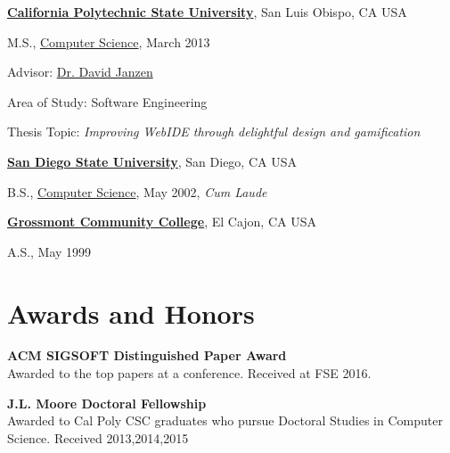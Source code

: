 \documentclass[10pt]{article}
\begin{document}
        
\href{http://www.calpoly.edu/}{\textbf{California Polytechnic State University}},
San Luis Obispo, CA USA
\begin{outerlist}
\item[] M.S.,
		\vspace{-.2\baselineskip}
        \href{https://www.csc.calpoly.edu/}
             {Computer Science}, March 2013
              \begin{innerlist}
             \item Advisor:
              \href{https://users.csc.calpoly.edu/~djanzen/}
                   {Dr. David Janzen} 
        \item Area of Study: Software Engineering 
        \item Thesis Topic: \emph{Improving WebIDE through delightful design and gamification}
        \end{innerlist}
              
\end{outerlist}
\vspace{.5\baselineskip}

\href{https://www.sdsu.edu/}{\textbf{San Diego State University}},
San Diego, CA USA
\begin{outerlist}

\item[] B.S.,
        \href{https://www.cs.sdsu.edu/}
             {Computer Science}, May 2002, \emph{Cum Laude}
\end{outerlist}
\vspace{.5\baselineskip}


\href{http://www.grossmont.edu/}{\textbf{Grossmont Community College}},
El Cajon, CA USA
\begin{outerlist}

\item[] A.S.,
             May 1999
\end{outerlist}

\section{Awards and Honors}
\textbf{ACM SIGSOFT Distinguished Paper Award}\\
Awarded to the top papers at a conference. Received at FSE 2016.

\textbf{J.L. Moore Doctoral Fellowship}  \\
Awarded to Cal Poly CSC graduates who pursue Doctoral Studies in Computer Science. Received 2013,2014,2015
\end{document}
